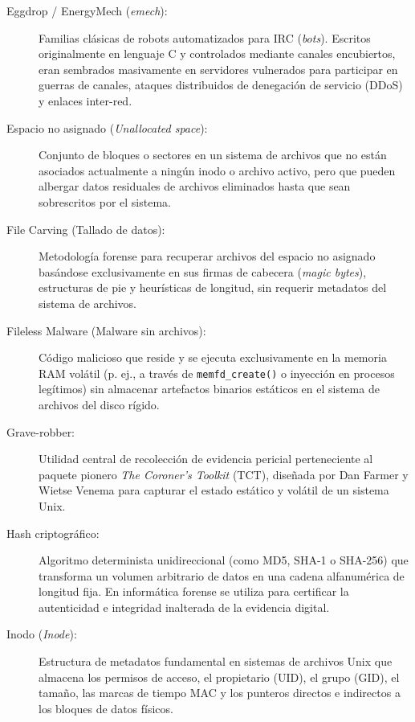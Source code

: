 \begin{description}
    \item[Eggdrop / EnergyMech (\textit{emech}):] Familias clásicas de robots automatizados para IRC (\textit{bots}). Escritos originalmente en lenguaje C y controlados mediante canales encubiertos, eran sembrados masivamente en servidores vulnerados para participar en guerras de canales, ataques distribuidos de denegación de servicio (DDoS) y enlaces inter-red.

    \item[Espacio no asignado (\textit{Unallocated space}):] Conjunto de bloques o sectores en un sistema de archivos que no están asociados actualmente a ningún inodo o archivo activo, pero que pueden albergar datos residuales de archivos eliminados hasta que sean sobrescritos por el sistema.

    \item[File Carving (Tallado de datos):] Metodología forense para recuperar archivos del espacio no asignado basándose exclusivamente en sus firmas de cabecera (\textit{magic bytes}), estructuras de pie y heurísticas de longitud, sin requerir metadatos del sistema de archivos.

    \item[Fileless Malware (Malware sin archivos):] Código malicioso que reside y se ejecuta exclusivamente en la memoria RAM volátil (p. ej., a través de \texttt{memfd\_create()} o inyección en procesos legítimos) sin almacenar artefactos binarios estáticos en el sistema de archivos del disco rígido.

    \item[Grave-robber:] Utilidad central de recolección de evidencia pericial perteneciente al paquete pionero \textit{The Coroner's Toolkit} (TCT), diseñada por Dan Farmer y Wietse Venema para capturar el estado estático y volátil de un sistema Unix.

    \item[Hash criptográfico:] Algoritmo determinista unidireccional (como MD5, SHA-1 o SHA-256) que transforma un volumen arbitrario de datos en una cadena alfanumérica de longitud fija. En informática forense se utiliza para certificar la autenticidad e integridad inalterada de la evidencia digital.

    \item[Inodo (\textit{Inode}):] Estructura de metadatos fundamental en sistemas de archivos Unix que almacena los permisos de acceso, el propietario (UID), el grupo (GID), el tamaño, las marcas de tiempo MAC y los punteros directos e indirectos a los bloques de datos físicos.


\end{description}
